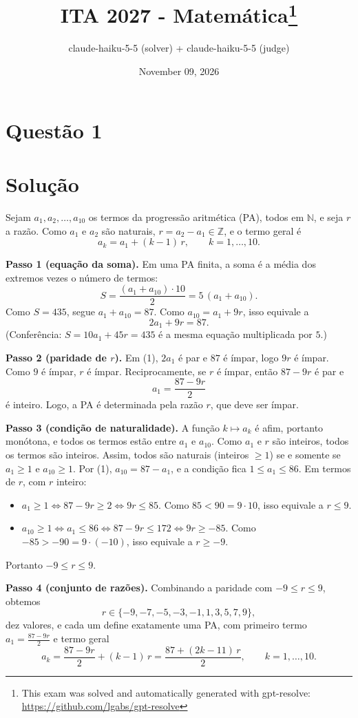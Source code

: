 \documentclass{article}%
\title{ITA 2027 - Matemática\thanks{This exam was solved and automatically generated with gpt-resolve: \url{https://github.com/lgabs/gpt-resolve}}}%
\author{claude{-}haiku{-}5{-}5 (solver) + claude{-}haiku{-}5{-}5 (judge)}%
\date{November 09, 2026}%
\begin{document}
%
\normalsize%
\maketitle%
\section*{Questão 1}

\section*{Solução}

Sejam $a_1, a_2, \ldots, a_{10}$ os termos da progressão aritmética (PA), todos em $\mathbb{N}$, e seja $r$ a razão. Como $a_1$ e $a_2$ são naturais, $r = a_2 - a_1 \in \mathbb{Z}$, e o termo geral é
\[
a_k = a_1 + (k-1)\,r, \qquad k = 1, \ldots, 10.
\]

\textbf{Passo 1 (equação da soma).} Em uma PA finita, a soma é a média dos extremos vezes o número de termos:
\[
S = \frac{(a_1 + a_{10})\cdot 10}{2} = 5\,(a_1 + a_{10}).
\]
Como $S = 435$, segue $a_1 + a_{10} = 87$. Como $a_{10} = a_1 + 9r$, isso equivale a
\[
2a_1 + 9r = 87. \tag{1}
\]
(Conferência: $S = 10a_1 + 45r = 435$ é a mesma equação multiplicada por $5$.)

\textbf{Passo 2 (paridade de $r$).} Em (1), $2a_1$ é par e $87$ é ímpar, logo $9r$ é ímpar. Como $9$ é ímpar, $r$ é ímpar. Reciprocamente, se $r$ é ímpar, então $87 - 9r$ é par e
\[
a_1 = \frac{87 - 9r}{2}
\]
é inteiro. Logo, a PA é determinada pela razão $r$, que deve ser ímpar.

\textbf{Passo 3 (condição de naturalidade).} A função $k \mapsto a_k$ é afim, portanto monótona, e todos os termos estão entre $a_1$ e $a_{10}$. Como $a_1$ e $r$ são inteiros, todos os termos são inteiros. Assim, todos são naturais (inteiros $\geq 1$) se e somente se $a_1 \geq 1$ e $a_{10} \geq 1$. Por (1), $a_{10} = 87 - a_1$, e a condição fica $1 \leq a_1 \leq 86$. Em termos de $r$, com $r$ inteiro:
\begin{itemize}
\item $a_1 \geq 1 \iff 87 - 9r \geq 2 \iff 9r \leq 85$. Como $85 < 90 = 9\cdot 10$, isso equivale a $r \leq 9$.
\item $a_{10} \geq 1 \iff a_1 \leq 86 \iff 87 - 9r \leq 172 \iff 9r \geq -85$. Como $-85 > -90 = 9\cdot(-10)$, isso equivale a $r \geq -9$.
\end{itemize}
Portanto $-9 \leq r \leq 9$.

\textbf{Passo 4 (conjunto de razões).} Combinando a paridade com $-9 \leq r \leq 9$, obtemos
\[
r \in \{-9, -7, -5, -3, -1, 1, 3, 5, 7, 9\},
\]
dez valores, e cada um define exatamente uma PA, com primeiro termo $a_1 = \frac{87-9r}{2}$ e termo geral
\[
a_k = \frac{87 - 9r}{2} + (k-1)\,r = \frac{87 + (2k-11)\,r}{2}, \qquad k = 1, \ldots, 10.
\]
\end{document}
